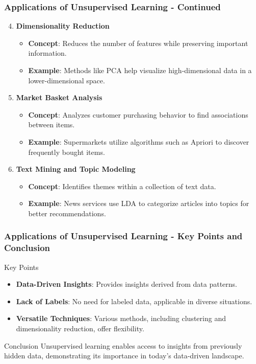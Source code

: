 \documentclass[aspectratio=169]{beamer}
\begin{document}
\begin{frame}[fragile]
    \frametitle{Applications of Unsupervised Learning - Continued}
    \begin{enumerate}
        \setcounter{enumi}{3}
        \item \textbf{Dimensionality Reduction}  
        \begin{itemize}
            \item \textbf{Concept}: Reduces the number of features while preserving important information.
            \item \textbf{Example}: Methods like PCA help visualize high-dimensional data in a lower-dimensional space.
        \end{itemize}

        \item \textbf{Market Basket Analysis}  
        \begin{itemize}
            \item \textbf{Concept}: Analyzes customer purchasing behavior to find associations between items.
            \item \textbf{Example}: Supermarkets utilize algorithms such as Apriori to discover frequently bought items.
        \end{itemize}

        \item \textbf{Text Mining and Topic Modeling}  
        \begin{itemize}
            \item \textbf{Concept}: Identifies themes within a collection of text data.
            \item \textbf{Example}: News services use LDA to categorize articles into topics for better recommendations.
        \end{itemize}
    \end{enumerate}
\end{frame}

\begin{frame}[fragile]
    \frametitle{Applications of Unsupervised Learning - Key Points and Conclusion}
    \begin{block}{Key Points}
        \begin{itemize}
            \item \textbf{Data-Driven Insights}: Provides insights derived from data patterns.
            \item \textbf{Lack of Labels}: No need for labeled data, applicable in diverse situations.
            \item \textbf{Versatile Techniques}: Various methods, including clustering and dimensionality reduction, offer flexibility.
        \end{itemize}
    \end{block}

    \begin{block}{Conclusion}
        Unsupervised learning enables access to insights from previously hidden data, demonstrating its importance in today's data-driven landscape.
    \end{block}
\end{frame}
\end{document}
